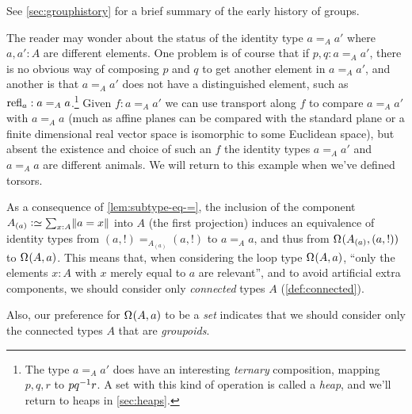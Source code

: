 See \cref{sec:grouphistory} for a brief summary of the early history of groups.
\begin{remark}
  The reader may wonder about the status of the identity type $a=_Aa'$ where $a,a':A$ are different elements.
  One problem is of course that if $p,q:a=_Aa'$,
  there is no obvious way of composing $p$ and $q$
  to get another element in $a=_A a'$,
  and another is that $a=_Aa'$ does not have a distinguished element,
  such as $\refl{a}:a=_Aa$.\footnote{%
    The type $a=_A a'$ does have an interesting \emph{ternary}
    composition, mapping $p,q,r$ to $pq^{-1}r$.
    A set with this kind of operation is called a \emph{heap},
    and we'll return to heaps in \cref{sec:heaps}.}
Given $f:a=_Aa'$ we can use transport along $f$ to compare $a=_Aa'$ with $a=_Aa$ (much as affine planes can be compared with the standard plane or a finite dimensional real vector space is isomorphic to some Euclidean space), but absent the existence and choice of such an $f$ the identity types $a=_Aa'$ and $a=_Aa$ are different animals.  
We will return to this example when we've defined torsors.
\end{remark}


\begin{remark}
  \label{rem:whypointedconngpoid}
  As a consequence of \cref{lem:subtype-eq-=},
  the inclusion of the component $\conncomp A a \defequi \sum_{x:A}\Trunc{a=x}$ into $A$
  (\ie the first projection)
  induces an equivalence of identity types
  from $(a,!)=_{A_{(a)}}(a,!)$ to $a=_Aa$,
  and thus from $\loops(A_{(a)},(a,!))$ to $\loops(A,a)$.
  This means that, when considering the loop type $\loops(A,a)$,
  ``only the elements $x:A$ with $x$ merely equal to $a$ are relevant'',
  and to avoid artificial extra components,
  we should consider only \emph{connected} types $A$ (\cf \cref{def:connected}).

  Also, our preference for $\loops(A,a)$ to be a \emph{set}
  indicates that we should consider only the connected types $A$
  that are \emph{groupoids}.
\end{remark}

